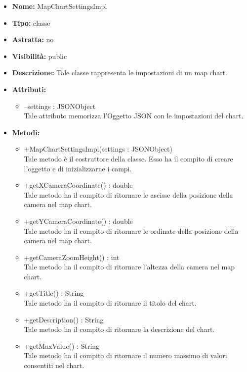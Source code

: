 			
			\begin{itemize}
			\item \textbf{Nome:} MapChartSettingsImpl
			\item \textbf{Tipo:} classe
			
		\item \textbf{Astratta:}
		no
			\item \textbf{Visibilità:} public
			\item \textbf{Descrizione:} Tale classe rappresenta le impostazioni di un map chart.
			\item \textbf{Attributi:}
				\begin{itemize}
				\setlength{\itemsep}{5pt}
				
					\item[\ding{111}] {--settings : JSONObject} \\ [1mm] Tale attributo memorizza l'Oggetto JSON con le impostazioni del chart.
				\end{itemize}
		
			\item \textbf{Metodi:}
				\begin{itemize}
				\setlength{\itemsep}{5pt}
				
					\item[\ding{111}] {{+MapChartSettingsImpl(settings : JSONObject)}} \\ [1mm] Tale metodo è il costruttore della classe. Esso ha il compito di creare l'oggetto e di inizializzarne i campi.
					\item[\ding{111}] {{+getXCameraCoordinate() : double}} \\ [1mm] Tale metodo ha il compito di ritornare le ascisse della posizione della camera nel map chart.
					\item[\ding{111}] {{+getYCameraCoordinate() : double}} \\ [1mm] Tale metodo ha il compito di ritornare le ordinate della posizione della camera nel map chart.
					\item[\ding{111}] {{+getCameraZoomHeight() : int}} \\ [1mm] Tale metodo ha il compito di ritornare l'altezza della camera nel map chart.
					\item[\ding{111}] {{+getTitle() : String}} \\ [1mm] Tale metodo ha il compito di ritornare il titolo del chart.
					\item[\ding{111}] {{+getDescription() : String}} \\ [1mm] Tale metodo ha il compito di ritornare la descrizione del chart.
					\item[\ding{111}] {{+getMaxValue() : String}} \\ [1mm] Tale metodo ha il compito di ritornare il numero massimo di valori consentiti nel chart.
				\end{itemize}
		
			\end{itemize}
	
